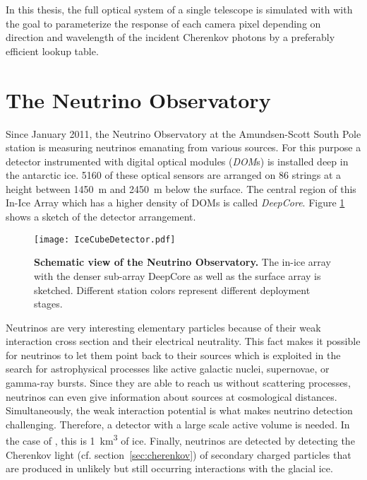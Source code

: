 In this thesis, the full optical system of a single \iceact telescope is simulated with \geant with the goal to parameterize the response of each camera pixel depending on direction and wavelength of the incident Cherenkov photons by a preferably efficient lookup table.

\section{The \icecube Neutrino Observatory}

Since January 2011, the \icecube Neutrino Observatory at the Amundsen-Scott South Pole station is measuring neutrinos emanating from various sources. For this purpose a detector instrumented with digital optical modules (\textit{DOM}s) is installed deep in the antarctic ice. 5160 of these optical sensors are arranged on 86 strings at a height between \SI{1450}{\meter} and \SI{2450}{\meter} below the surface. The central region of this In-Ice Array which has a higher density of DOMs is called \textit{DeepCore}. Figure \ref{icecube:detector} shows a sketch of the detector arrangement.\\

\begin{figure}[h]
	\texttt{[image: IceCubeDetector.pdf]}
	\caption[Schematic view of \icecube]{\textbf{Schematic view of the \icecube Neutrino Observatory.} \cite{icecube:instrumentation} The in-ice array with the denser sub-array DeepCore as well as the surface array \icetop is sketched. Different station colors represent different deployment stages.}
	\label{icecube:detector}
\end{figure}

Neutrinos are very interesting elementary particles because of their weak interaction cross section and their electrical neutrality. This fact makes it possible for neutrinos to let them point back to their sources which is exploited in the search for astrophysical processes like active galactic nuclei, supernovae, or gamma-ray bursts. Since they are able to reach us without scattering processes, neutrinos can even give information about sources at cosmological distances. Simultaneously, the weak interaction potential is what makes neutrino detection challenging. Therefore, a detector with a large scale active volume is needed. In the case of \icecube, this is \SI{1}{\cubic\kilo\meter} of ice. Finally, neutrinos are detected by detecting the Cherenkov light (cf. section~\ref{sec:cherenkov}) of secondary charged particles that are produced in unlikely but still occurring interactions with the glacial ice.\\


